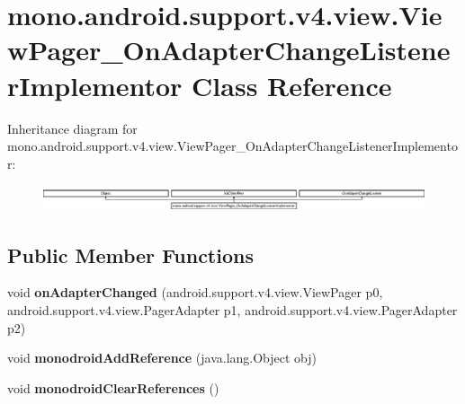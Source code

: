 \hypertarget{classmono_1_1android_1_1support_1_1v4_1_1view_1_1_view_pager___on_adapter_change_listener_implementor}{}\section{mono.\+android.\+support.\+v4.\+view.\+View\+Pager\+\_\+\+On\+Adapter\+Change\+Listener\+Implementor Class Reference}
\label{classmono_1_1android_1_1support_1_1v4_1_1view_1_1_view_pager___on_adapter_change_listener_implementor}
Inheritance diagram for mono.\+android.\+support.\+v4.\+view.\+View\+Pager\+\_\+\+On\+Adapter\+Change\+Listener\+Implementor\+:\begin{figure}[H]
\begin{center}
\leavevmode
\includegraphics[height=0.774550cm]{classmono_1_1android_1_1support_1_1v4_1_1view_1_1_view_pager___on_adapter_change_listener_implementor}
\end{center}
\end{figure}
\subsection*{Public Member Functions}
\begin{DoxyCompactItemize}
\item 
\mbox{\label{classmono_1_1android_1_1support_1_1v4_1_1view_1_1_view_pager___on_adapter_change_listener_implementor_aa7fc7de992a40dc7b7225b610a738b88}} 
void {\bfseries on\+Adapter\+Changed} (android.\+support.\+v4.\+view.\+View\+Pager p0, android.\+support.\+v4.\+view.\+Pager\+Adapter p1, android.\+support.\+v4.\+view.\+Pager\+Adapter p2)
\item 
\mbox{\label{classmono_1_1android_1_1support_1_1v4_1_1view_1_1_view_pager___on_adapter_change_listener_implementor_ad7259d1363b7e277b5f5737d2b16b05a}} 
void {\bfseries monodroid\+Add\+Reference} (java.\+lang.\+Object obj)
\item 
\mbox{\label{classmono_1_1android_1_1support_1_1v4_1_1view_1_1_view_pager___on_adapter_change_listener_implementor_add7cb4630bc0f072ba6327ad7f8690c8}} 
void {\bfseries monodroid\+Clear\+References} ()
\end{DoxyCompactItemize}
